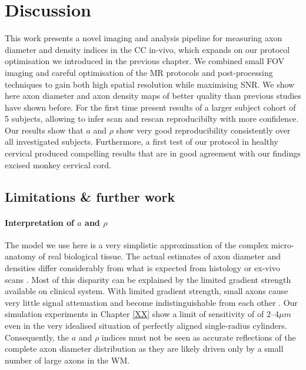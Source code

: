 \section{Discussion}
This work presents a novel imaging and analysis pipeline for measuring axon diameter and density indices in the CC in-vivo, which expands on our \SFasym{} protocol optimisation we introduced in the previous chapter. We combined small FOV imaging and careful optimisation of the MR protocols and post-processing techniques to gain both high spatial resolution while maximising SNR. We show here axon diameter and axon density maps of better quality than previous studies have shown before. For the first time present results of a larger subject cohort of 5 subjects, allowing to infer scan and rescan reproducibilty with more confidence. Our results show that $a$ and $\rho$ show very good reproducibility consistently over all investigated subjects. Furthermore, a first test of our protocol in healthy cervical produced compelling results that are in good agreement with our findings excised monkey cervical cord.

\subsection*{Limitations \& further work}
\paragraph{Interpretation of $a$ and $\rho$}The model we use here is a very simplistic approximation of the complex micro-anatomy of real biological tissue. The actual estimates of axon diameter and densities differ considerably from what is expected from histology or ex-vivo scans \citep{Alexander:2010}. Most of this disparity can be explained by the limited gradient strength available on clinical system.  With limited gradient strength, small axons cause very little signal attenuation and become indistinguishable from each other \citep{Yeh:XXXX, Latt:YYYY}. Our simulation experiments in Chapter \ref{XX} show a limit of sensitivity of of 2--4$\mu m$ even in the very idealised situation of perfectly aligned single-radius cylinders. Consequently, the $a$ and $\rho$ indices must not be seen as accurate reflections of the complete axon diameter distribution as they are likely driven only by a small number of large axons in the WM. 

